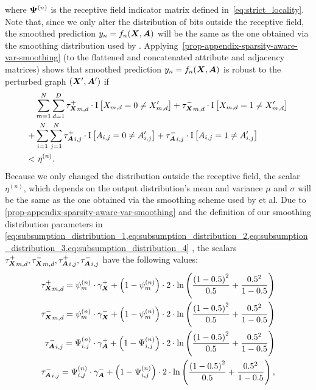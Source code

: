 where ${\bm{\Psi}}^{(n)}$ is the receptive field indicator matrix defined in~\autoref{eq:strict_locality}.
Note that, since we only alter the distribution of bits outside the receptive field, the smoothed prediction $y_n = f_n({\bm{X}}, {\bm{A}})$ will be the same as the one obtained via the smoothing distribution used by \citet{Schuchardt2021}.
Applying~\cref{prop-appendix-sparsity-aware-var-smoothing} (to the flattened and concatenated attribute and adjacency matrices) shows that smoothed prediction $y_n = f_n({\bm{X}}, {\bm{A}})$ is robust to the perturbed graph $\left({\bm{X}}', {\bm{A}}'\right)$ if
\begin{equation}
\begin{split}\label{eq:subsumption_base_cert_1}
        &\sum_{m=1}^{N}\sum_{d=1}^{D}
            {\tau_\mX^{+}}_{m,d} \cdot \mathrm{I}\left[\emX_{m,d} = 0 \neq \emX'_{m,d}\right]  + 
            {\tau_\mX^{-}}_{m,d} \cdot \mathrm{I}\left[\emX_{m,d} = 1 \neq \emX'_{m,d}\right]
            \\
            +
            &
           \sum_{i=1}^{N}\sum_{j=1}^{N}
            {\tau_\mA^{+}}_{i,j} \cdot \mathrm{I}\left[\emA_{i,j} = 0 \neq \emA'_{i,j}\right]  + 
           {\tau_\mA^{-}}_{i,j} \cdot \mathrm{I}\left[\emA_{i,j} = 1 \neq \emA'_{i,j}\right]
                        \\
           <
           & \ 
            \eta^{(n)}.
\end{split}
\end{equation}
Because we only changed the distribution outside the receptive field,
the scalar $\eta^{(n)}$, which depends on the output distribution's mean and variance $\mu$ and $\sigma$ will be the same as the one obtained via the smoothing scheme used by \citet{Schuchardt2021} et al.
Due to \cref{prop-appendix-sparsity-aware-var-smoothing} and the definition of our smoothing distribution parameters in
\cref{eq:subsumption_distribution_1,eq:subsumption_distribution_2,eq:subsumption_distribution_3,eq:subsumption_distribution_4}
, the scalars ${\tau_{\bm{X}}^{+}}_{m,d},{\tau_{\bm{X}}^{-}}_{m,d},{\tau_{\bm{A}}^{+}}_{i,j},{\tau_{\bm{A}}^{-}}_{i,j}$ have the following values:
\begin{align}
    {\tau_{\bm{X}}^{+}}_{m,d} = {\psi}^{(n)}_m \cdot \gamma_{\bm{X}}^{+} + \left(1 - {\psi}^{(n)}_m \right) \cdot 2 \cdot 
    \ln\left( \frac{\left(1 - 0.5\right)^2}{0.5}
    + \frac{0.5^2}{1 - 0.5}
    \right)
    \\
    {\tau_{\bm{X}}^{-}}_{m,d} = {\psi}^{(n)}_m \cdot \gamma_{\bm{X}}^{-} + \left(1 - {\psi}^{(n)}_m \right) \cdot 2 \cdot 
    \ln\left( \frac{\left(1 - 0.5\right)^2}{0.5}
    + \frac{0.5^2}{1 - 0.5}
    \right)
    \\
    {\tau_{\bm{A}}^{-}}_{i,j} ={\Psi}^{(n)}_{i,j} \cdot \gamma_{\bm{A}}^{+} + \left(1 - {\Psi}^{(n)}_{i,j} \right) \cdot 2 \cdot 
    \ln\left( \frac{\left(1 - 0.5\right)^2}{0.5}
    + \frac{0.5^2}{1 - 0.5}
    \right)
    \\
    {\tau_{\bm{A}}^{-}}_{i,j} = {\Psi}^{(n)}_{i,j} \cdot \gamma_{\bm{A}}^{-} + \left(1 - {\Psi}^{(n)}_{i,j} \right) \cdot 2 \cdot 
    \ln\left( \frac{\left(1 - 0.5\right)^2}{0.5}
    + \frac{0.5^2}{1 - 0.5}
    \right),
\end{align}
